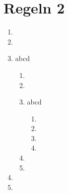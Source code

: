 \documentclass[ngerman]{scrartcl}
\begin{document}
	\section{Regeln 2}

	\begin{enumerate}
		\item \lipsum[1]
		\item \lipsum[1]
		\item abcd
			\begin{enumerate}
				\item \lipsum[1]
				\item \lipsum[1]
				\item abcd
					\begin{enumerate}
						\item \lipsum[1]
						\item \lipsum[1]
						\item \lipsum[1]
						\item \lipsum[1]
					\end{enumerate}
				\item \lipsum[1]
				\item \lipsum[1]
			\end{enumerate}
		\item \lipsum[1]
		\item \lipsum[1]
	\end{enumerate}
\end{document}
